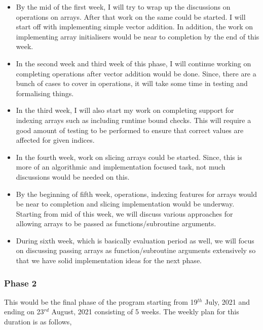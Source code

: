 \begin{itemize}

\item By the mid of the first week, I will try to wrap up the discussions on operations on arrays. After that work on the same could be started. I will start off with implementing simple vector addition. In addition, the work on implementing array initialisers would be near to completion by the end of this week.

\item In the second week and third week of this phase, I will continue working on completing operations after vector addition would be done. Since, there are a bunch of cases to cover in operations, it will take some time in testing and formalising things.

\item In the third week, I will also start my work on completing support for indexing arrays such as including runtime bound checks. This will require a good amount of testing to be performed to ensure that correct values are affected for given indices.

\item In the fourth week, work on slicing arrays could be started. Since, this is more of an algorithmic and implementation focused task, not much discussions would be needed on this.

\item By the beginning of fifth week, operations, indexing features for arrays would be near to completion and slicing implementation would be underway. Starting from mid of this week, we will discuss various approaches for allowing arrays to be passed as functions/subroutine arguments.

\item During sixth week, which is basically evaluation period as well, we will focus on discussing passing arrays as function/subroutine arguments extensively so that we have solid implementation ideas for the next phase.

\end{itemize}

\subsubsection{Phase 2}

This would be the final phase of the program starting from 19$^{th}$ July, 2021 and ending on 23$^{rd}$ August, 2021 consisting of 5 weeks. The weekly plan for this duration is as follows,

